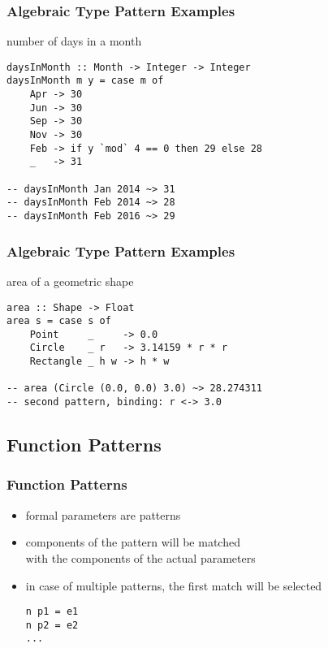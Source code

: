 \documentclass[dvipsnames]{beamer}
\theoremstyle{plain}
\begin{document}
\begin{frame}[fragile]
  \frametitle{Algebraic Type Pattern Examples}

  \begin{exampleblock}{number of days in a month}
    \begin{lstlisting}
daysInMonth :: Month -> Integer -> Integer
daysInMonth m y = case m of
    Apr -> 30
    Jun -> 30
    Sep -> 30
    Nov -> 30
    Feb -> if y `mod` 4 == 0 then 29 else 28
    _   -> 31

-- daysInMonth Jan 2014 ~> 31
-- daysInMonth Feb 2014 ~> 28
-- daysInMonth Feb 2016 ~> 29
    \end{lstlisting}
  \end{exampleblock}
\end{frame}

\begin{frame}[fragile]
  \frametitle{Algebraic Type Pattern Examples}

  \begin{exampleblock}{area of a geometric shape}
    \begin{lstlisting}
area :: Shape -> Float
area s = case s of
    Point     _     -> 0.0
    Circle    _ r   -> 3.14159 * r * r
    Rectangle _ h w -> h * w

-- area (Circle (0.0, 0.0) 3.0) ~> 28.274311
-- second pattern, binding: r <-> 3.0
    \end{lstlisting}
  \end{exampleblock}
\end{frame}

\subsection{Function Patterns}

\begin{frame}[fragile]
  \frametitle{Function Patterns}

  \begin{itemize}
    \item formal parameters are patterns
    \item components of the pattern will be matched\\
      with the components of the actual parameters

    \medskip
    \item in case of multiple patterns, the first match will be selected
    \smallskip
    \begin{lstlisting}
n p1 = e1
n p2 = e2
...
    \end{lstlisting}
  \end{itemize}
\end{frame}
\end{document}
